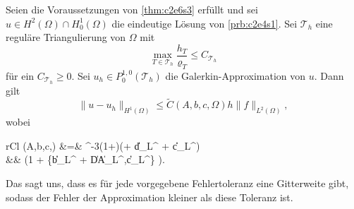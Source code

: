 \documentclass[../skript.tex]{subfiles}
\begin{document}
	
\begin{corollary}\label{cor:c2e6s3}
	Seien die Voraussetzungen von \cref{thm:c2e6s3} erfüllt und sei $u\in H^2(\Omega)\cap H^1_0(\Omega)$ die eindeutige Lösung von \cref{prb:c2e4s1}. Sei $\mathcal{T}_h$ eine reguläre Triangulierung von $\Omega$ mit 
	\[
		\max_{T\in\mathcal{T}_h} \frac{h_T}{\varrho_T} \leq C_{\mathcal{T}_h} 
	\]
	für ein $C_{\mathcal{T}_h} \geq 0$. Sei $u_h\in P^{1,0}_0(\mathcal{T}_h)$ die Galerkin-Approximation von $u$. Dann gilt
	\[
		\| u-u_h\|_{H^1(\Omega)}\leq \tilde{C}(A,b,c,\Omega)h\|f\|_{L^2(\Omega)},
	\]
	wobei 
	\begin{IEEEeqnarray*}{rCl}
		(A,b,c,\Omega) &=& \lambda^{-3}\left(1+\right)(\Lambda + \|d\|_{L^\infty} + \|c\|_{L^\infty}) \\ 
		&& \; {} \cdot \left(1 + \max\{\|b\|_{L^\infty} + \|DA\|_{L^\infty},\|c\|_{L^\infty}\} \right).
	\end{IEEEeqnarray*}
\end{corollary}
\begin{remarknonumb}
	Das sagt uns, dass es für jede vorgegebene Fehlertoleranz eine Gitterweite gibt, sodass der Fehler der Approximation kleiner als diese Toleranz ist.
\end{remarknonumb}
\end{document}
